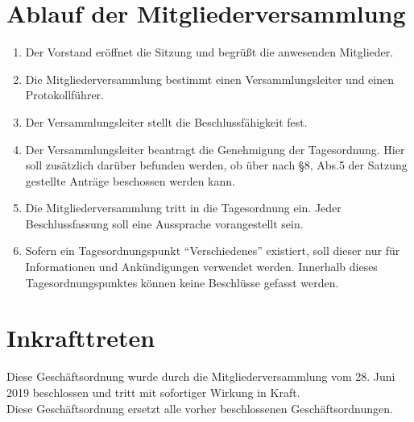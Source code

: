 \documentclass[a4paper, 12pt]{scrartcl}
\begin{document}
\section{Ablauf der Mitgliederversammlung}
\begin{enumerate} 
	\item Der Vorstand eröffnet die Sitzung und begrüßt die anwesenden Mitglieder.
	\item Die Mitgliederversammlung bestimmt einen Versammlungsleiter und einen Protokollführer.
	\item Der Versammlungsleiter stellt die Beschlussfähigkeit fest.
	\item Der Versammlungsleiter beantragt die Genehmigung der Tagesordnung. Hier soll zusätzlich darüber befunden werden, ob über nach §8, Abs.5 der Satzung gestellte Anträge beschossen werden kann.
	\item Die Mitgliederversammlung tritt in die Tagesordnung ein. Jeder Beschlussfassung soll eine Aussprache vorangestellt sein.
	\item Sofern ein Tagesordnungspunkt "`Verschiedenes"' existiert, soll dieser nur für Informationen und Ankündigungen verwendet werden.
	Innerhalb dieses Tagesordnungspunktes können keine Beschlüsse gefasst werden.
\end{enumerate}

\section{Inkrafttreten}
Diese Geschäftsordnung wurde durch die Mitgliederversammlung vom 28. Juni 2019 beschlossen und tritt mit sofortiger Wirkung in Kraft.\\
Diese Geschäftsordnung ersetzt alle vorher beschlossenen Geschäftsordnungen.
\end{document}
